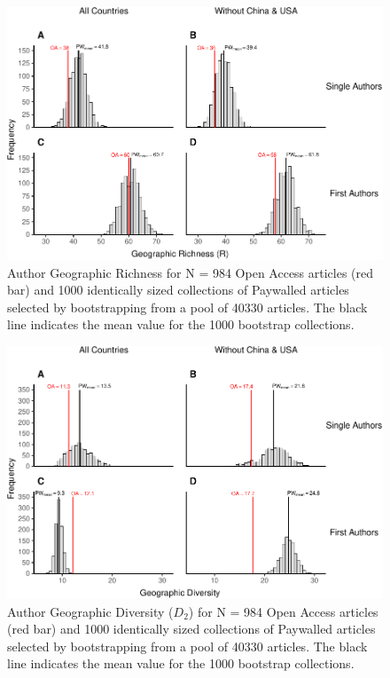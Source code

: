 \documentclass[english,man]{apa6}
\begin{document}
\begin{figure}

{\centering \includegraphics{Smith_etal_APC_ms_files/figure-latex/Fig3-1} 

}

\caption{Author Geographic Richness for N =  984  Open Access articles (red bar) and 1000 identically sized collections of Paywalled articles selected by bootstrapping from a pool of  40330  articles. The black line indicates the mean value for the 1000 bootstrap collections.}\label{fig:Fig3}
\end{figure}

\begin{figure}

{\centering \includegraphics{Smith_etal_APC_ms_files/figure-latex/Fig4-1} 

}

\caption{Author Geographic Diversity ($D_2$) for N =  984  Open Access articles (red bar) and 1000 identically sized collections of Paywalled articles selected by bootstrapping from a pool of  40330  articles.  The black line indicates the mean value for the 1000 bootstrap collections.}\label{fig:Fig4}
\end{figure}
\end{document}
